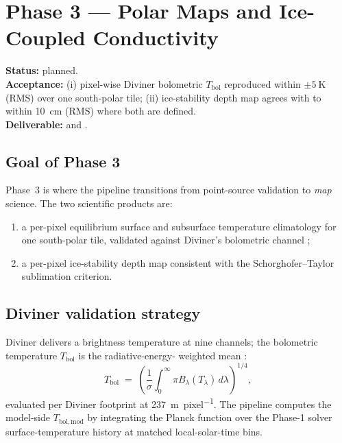 \chapter{Phase 3 --- Polar Maps and Ice-Coupled Conductivity}
\label{chap:phase3}

\begin{milestone}
\textbf{Status:} planned.\\
\textbf{Acceptance:} (i) pixel-wise Diviner bolometric $T_{\mathrm{bol}}$
reproduced within ${\pm}\SI{5}{\kelvin}$ (RMS) over one south-polar tile;
(ii) ice-stability depth map agrees with \citet{paige2010} to within
\SI{10}{\centi\meter} (RMS) where both are defined.\\
\textbf{Deliverable:} 
and .
\end{milestone}

\section{Goal of Phase 3}

Phase~3 is where the pipeline transitions from point-source validation
to \emph{map} science.  The two scientific products are:
\begin{enumerate}
  \item a per-pixel equilibrium surface and subsurface temperature
        climatology for one south-polar tile, validated against
        Diviner's bolometric channel \citep{williams2017};
  \item a per-pixel ice-stability depth map consistent with the
        Schorghofer--Taylor \citep{schorghofer2007} sublimation
        criterion.
\end{enumerate}

\section{Diviner validation strategy}

Diviner delivers a brightness temperature at nine channels; the
bolometric temperature $T_{\mathrm{bol}}$ is the radiative-energy-
weighted mean \citep{paige2010prp}:
\begin{equation}
  T_{\mathrm{bol}}
  \;=\;
  \left(\frac{1}{\sigma}\int_0^\infty
        \pi B_\lambda(T_\lambda)\,d\lambda
  \right)^{1/4},
  \label{eq:Tbol}
\end{equation}
evaluated per Diviner footprint at \SI{237}{\meter\per pixel}.  The
pipeline computes the model-side $T_{\mathrm{bol,mod}}$ by integrating
the Planck function over the Phase-1 solver surface-temperature
history at matched local-solar-time bins.

